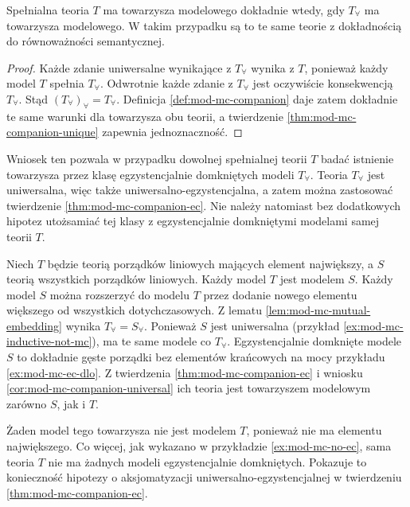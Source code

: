 \begin{wniosek}
\label{cor:mod-mc-companion-universal}
Spełnialna teoria $T$ ma towarzysza modelowego dokładnie
wtedy, gdy $T_{\forall}$ ma towarzysza modelowego.
W takim przypadku są to te same teorie z dokładnością
do równoważności semantycznej.
\end{wniosek}
\begin{proof}
Każde zdanie uniwersalne wynikające z $T_{\forall}$
wynika z $T$, ponieważ każdy model $T$ spełnia
$T_{\forall}$. Odwrotnie każde zdanie z $T_{\forall}$
jest oczywiście konsekwencją $T_{\forall}$.
Stąd $(T_{\forall})_{\forall}=T_{\forall}$.
Definicja \ref{def:mod-mc-companion} daje zatem
dokładnie te same warunki dla towarzysza obu teorii,
a twierdzenie \ref{thm:mod-mc-companion-unique}
zapewnia jednoznaczność.
\end{proof}

Wniosek ten pozwala w przypadku dowolnej spełnialnej
teorii $T$ badać istnienie towarzysza przez klasę
egzystencjalnie domkniętych modeli $T_{\forall}$.
Teoria $T_{\forall}$ jest uniwersalna, więc także
uniwersalno-egzystencjalna, a zatem można zastosować
twierdzenie \ref{thm:mod-mc-companion-ec}.
Nie należy natomiast bez dodatkowych hipotez
utożsamiać tej klasy z egzystencjalnie domkniętymi
modelami samej teorii $T$.

\begin{przyklad}
\label{ex:mod-mc-companion-not-extension}
Niech $T$ będzie teorią porządków liniowych mających
element największy, a $S$ teorią wszystkich porządków
liniowych. Każdy model $T$ jest modelem $S$.
Każdy model $S$ można rozszerzyć do modelu $T$
przez dodanie nowego elementu większego od wszystkich
dotychczasowych. Z lematu
\ref{lem:mod-mc-mutual-embedding} wynika
$T_{\forall}=S_{\forall}$. Ponieważ $S$ jest
uniwersalna (przykład \ref{ex:mod-mc-inductive-not-mc}),
ma te same modele co $T_{\forall}$.
Egzystencjalnie domknięte modele $S$ to dokładnie
gęste porządki bez elementów krańcowych na mocy
przykładu \ref{ex:mod-mc-ec-dlo}. Z twierdzenia
\ref{thm:mod-mc-companion-ec} i wniosku
\ref{cor:mod-mc-companion-universal} ich teoria
jest towarzyszem modelowym zarówno $S$, jak i $T$.

Żaden model tego towarzysza nie jest modelem $T$,
ponieważ nie ma elementu największego.
Co więcej, jak wykazano w przykładzie
\ref{ex:mod-mc-no-ec}, sama teoria $T$ nie ma
żadnych modeli egzystencjalnie domkniętych.
Pokazuje to konieczność hipotezy o aksjomatyzacji
uniwersalno-egzystencjalnej w twierdzeniu
\ref{thm:mod-mc-companion-ec}.
\end{przyklad}

